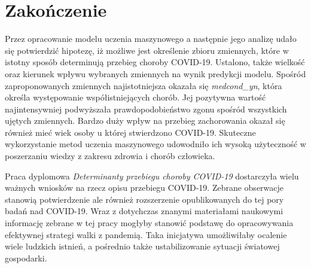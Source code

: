 \documentclass[polish, twoside, 12pt, a4paper]{article}
\theoremstyle{definition}
\theoremstyle{plain}
\theoremstyle{remark}
\begin{document}
\clearpage
\section{Zakończenie}

Przez opracowanie modelu uczenia maszynowego a następnie jego analizę udało się potwierdzić hipotezę, iż możliwe jest określenie zbioru zmiennych, które w istotny sposób determinują przebieg choroby COVID-19. Ustalono, także wielkość oraz kierunek wpływu wybranych zmiennych na wynik predykcji modelu. Spośród zaproponowanych zmiennych najistotniejsza okazała się \emph{medcond\_yn}, która określa występowanie współistniejących chorób. Jej pozytywna wartość najintensywniej podwyższała prawdopodobieństwo zgonu spośród wszystkich ujętych zmiennych. Bardzo duży wpływ na przebieg zachorowania okazał się również mieć wiek osoby u której stwierdzono COVID-19. Skuteczne wykorzystanie metod uczenia maszynowego udowodniło ich wysoką użyteczność w poszerzaniu wiedzy z zakresu zdrowia i chorób człowieka.

Praca dyplomowa \emph{Determinanty przebiegu choroby COVID-19} dostarczyła wielu ważnych wniosków na rzecz opisu przebiegu COVID-19. Zebrane obserwacje stanowią potwierdzenie ale również rozszerzenie opublikowanych do tej pory badań nad COVID-19. Wraz z dotychczas znanymi materiałami naukowymi informację zebrane w tej pracy mogłyby stanowić podstawę do opracowywania efektywnej strategi walki z pandemią. Taka inicjatywa umożliwiłaby ocalenie wiele ludzkich istnień, a pośrednio także ustabilizowanie sytuacji światowej gospodarki. 




\appendix

\clearpage
\end{document}
